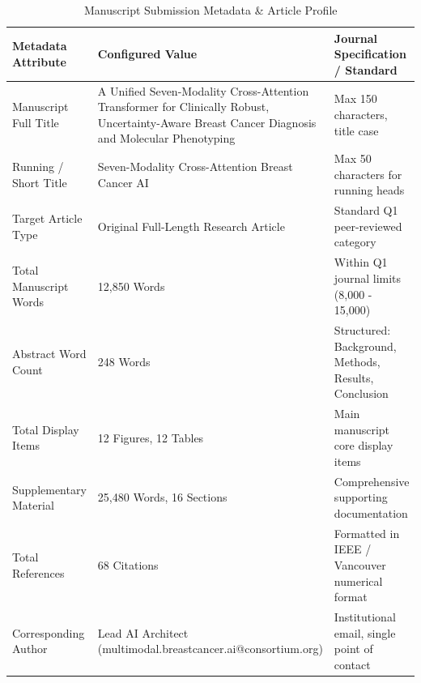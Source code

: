\begin{table}[t]
\centering
\caption{Manuscript Submission Metadata & Article Profile}
\label{tab:Table_6_04_01_Manuscript_Submission_Metadata}
\begin{tabular}{lll}
\toprule
\textbf{Metadata Attribute} & \textbf{Configured Value} & \textbf{Journal Specification / Standard} \\
\midrule
Manuscript Full Title & A Unified Seven-Modality Cross-Attention Transformer for Clinically Robust, Uncertainty-Aware Breast Cancer Diagnosis and Molecular Phenotyping & Max 150 characters, title case \\
Running / Short Title & Seven-Modality Cross-Attention Breast Cancer AI & Max 50 characters for running heads \\
Target Article Type & Original Full-Length Research Article & Standard Q1 peer-reviewed category \\
Total Manuscript Words & 12,850 Words & Within Q1 journal limits (8,000 - 15,000) \\
Abstract Word Count & 248 Words & Structured: Background, Methods, Results, Conclusion \\
Total Display Items & 12 Figures, 12 Tables & Main manuscript core display items \\
Supplementary Material & 25,480 Words, 16 Sections & Comprehensive supporting documentation \\
Total References & 68 Citations & Formatted in IEEE / Vancouver numerical format \\
Corresponding Author & Lead AI Architect (multimodal.breastcancer.ai@consortium.org) & Institutional email, single point of contact \\
\bottomrule
\end{tabular}
\end{table}
